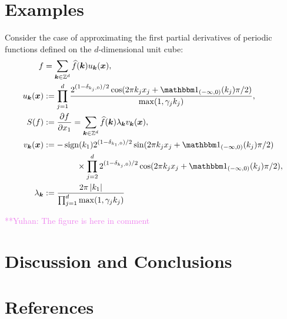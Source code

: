 \documentclass[final]{elsarticle}
\newcommand{\pin}{p_{\text{\rm{in}}}}
\newcommand{\pout}{p_{\text{\rm{out}}}}
\theoremstyle{definition}
\theoremstyle{remark}
\newcommand{\yuhannote}[1]{ {\textcolor{violet}  {\mbox{**Yuhan:} #1}}}
\begin{document}
\section{Examples} \label{sec:examp}

Consider the case of approximating the first partial derivatives of periodic functions defined on the $d$-dimensional unit cube:
\begin{align*}
f &= \sum_{\vk \in \integers^d} \hf(\vk) u_{\vk} (\vx), \\
u_{\vk} (\vx) &:= \prod_{j=1}^d \frac{2^{(1-\delta_{k_j,0})/2}\cos(2\pi k_j x_j  + \bbone_{(-\infty,0)}(k_j) \pi/2 )}{\max(1,\gamma_j k_j)},  \\
S(f) &: = \frac{\partial f}{\partial x_1} = \sum_{\vk \in \integers^d} \hf(\vk) \lambda_{\vk} v_{\vk} (\vx), \\
v_{\vk}(\vx) & : =  -\sign(k_1) 2^{(1-\delta_{k_1,0})/2} \sin(2\pi k_j x_j  + \bbone_{(-\infty,0)}(k_j) \pi/2 ) \\
& \qquad \qquad \times \prod_{j=2}^d 2^{(1-\delta_{k_j,0})/2} \cos(2\pi k_j x_j  + \bbone_{(-\infty,0)}(k_j) \pi/2 ), \\
\lambda_{\vk} &:= \frac{2 \pi \abs{k_1}}{\prod_{j=1}^d\max(1,\gamma_j k_j)}
\end{align*}

\yuhannote{The figure is here in comment}


%
%

\section{Discussion and Conclusions} \label{sec:conc}

\section*{References}


\end{document}
